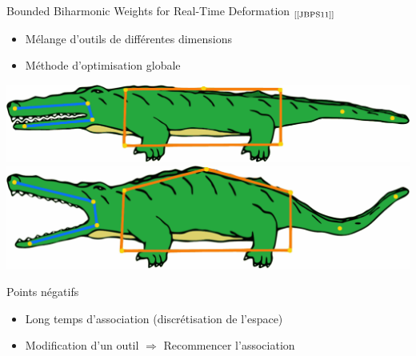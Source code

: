 \documentclass[xcolor=x11names,compress]{beamer}
\renewcommand{\(}{\begin{columns}} \renewcommand{\)}{\end{columns}}
\newcommand{\<}[1]{\begin{column}{#1}} \renewcommand{\>}{\end{column}}
\begin{document}
\begin{frame}{Bounded Biharmonic Weights for Real-Time Deformation 
$_{[\text{\cite{JBPS11}}]}$}

  \begin{itemize}
    \item Mélange d'outils de différentes dimensions
    \item Méthode d'optimisation globale
  \end{itemize}
  \centering
  \includegraphics[scale=0.25]{Alligator-avant}
  \includegraphics[scale=0.25]{Alligator-apres}
  \begin{alertblock}{Points négatifs}
    \begin{itemize}
    \item Long temps d'association (discrétisation de l'espace)
    \item Modification d'un outil $\Rightarrow$ Recommencer l'association
    \end{itemize}
  \end{alertblock}
\end{frame}
\end{document}
